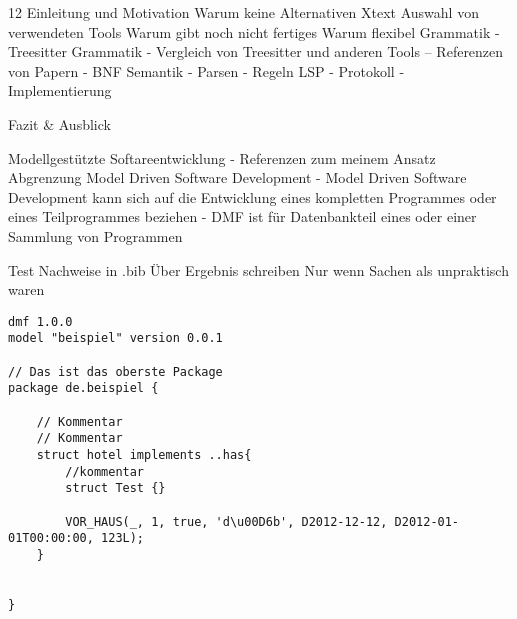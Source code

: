 

\normalsize{12}
	Einleitung und Motivation
	Warum keine Alternativen Xtext
	Auswahl von verwendeten Tools
	Warum gibt noch nicht fertiges
	Warum flexibel
	Grammatik
	- Treesitter Grammatik
	- Vergleich von Treesitter und anderen Tools
	-- Referenzen von Papern
	- BNF
    Semantik
    - Parsen
    - Regeln
    LSP
    - Protokoll
    - Implementierung

    Fazit & Ausblick

    Modellgestützte Softareentwicklung
    - Referenzen zum meinem Ansatz
    Abgrenzung Model Driven Software Development
    - Model Driven Software Development kann sich auf die Entwicklung eines kompletten Programmes oder eines Teilprogrammes beziehen
    - DMF ist für Datenbankteil eines oder einer Sammlung von Programmen
    
	Test
	Nachweise in .bib
	Über Ergebnis schreiben
	Nur wenn Sachen als unpraktisch waren
	
	
	\begin{lstlisting}
dmf 1.0.0
model "beispiel" version 0.0.1

// Das ist das oberste Package
package de.beispiel {

    // Kommentar
    // Kommentar
	struct hotel implements ..has{
	    //kommentar
	    struct Test {}
	    
	    VOR_HAUS(_, 1, true, 'd\u00D6b', D2012-12-12, D2012-01-01T00:00:00, 123L);
	}


}
\end{lstlisting}

